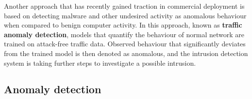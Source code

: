 \documentclass[a4paper,12pt,twoside]{report}
\begin{document}
Another approach that has recently gained traction in commercial deployment is based on detecting malware and other undesired activity as anomalous behaviour when compared to benign computer activity. In this approach, known as \textbf{traffic anomaly detection}, models that quantify the behaviour of normal network are trained on attack-free traffic data. Observed behaviour that significantly deviates from the trained model is then denoted as anomalous, and the intrusion detection system is taking further steps to investigate a possible intrusion. 



\subsection{Anomaly detection}
\end{document}
